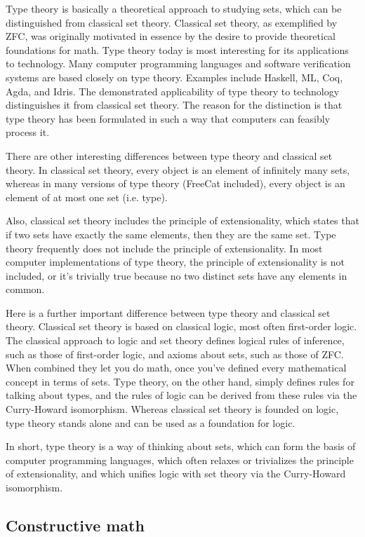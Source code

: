 \documentclass{article}
\begin{document}
Type theory is basically a theoretical approach to studying sets, which can be distinguished from classical set theory. Classical set theory, as exemplified by ZFC, was originally motivated in essence by the desire to provide theoretical foundations for math. Type theory today is most interesting for its applications to technology. Many computer programming languages and software verification systems are based closely on type theory. Examples include Haskell, ML, Coq, Agda, and Idris. The demonstrated applicability of type theory to technology distinguishes it from classical set theory. The reason for the distinction is that type theory has been formulated in such a way that computers can feasibly process it.

There are other interesting differences between type theory and classical set theory. In classical set theory, every object is an element of infinitely many sets, whereas in many versions of type theory (FreeCat included), every object is an element of at most one set (i.e. type).

Also, classical set theory includes the principle of extensionality, which states that if two sets have exactly the same elements, then they are the same set. Type theory frequently does not include the principle of extensionality. In most computer implementations of type theory, the principle of extensionality is not included, or it's trivially true because no two distinct sets have any elements in common.

Here is a further important difference between type theory and classical set theory. Classical set theory is based on classical logic, most often first-order logic. The classical approach to logic and set theory defines logical rules of inference, such as those of first-order logic, and axioms about sets, such as those of ZFC. When combined they let you do math, once you've defined every mathematical concept in terms of sets. Type theory, on the other hand, simply defines rules for talking about types, and the rules of logic can be derived from these rules via the Curry-Howard isomorphism. Whereas classical set theory is founded on logic, type theory stands alone and can be used as a foundation for logic.

In short, type theory is a way of thinking about sets, which can form the basis of computer programming languages, which often relaxes or trivializes the principle of extensionality, and which unifies logic with set theory via the Curry-Howard isomorphism.

\subsection{Constructive math}
\end{document}
